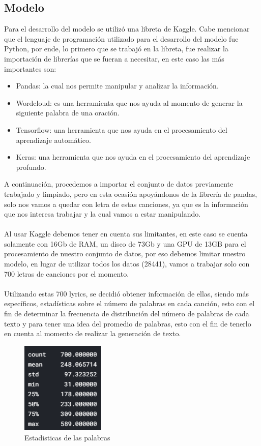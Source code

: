 \subsection{Modelo}
Para el desarrollo del modelo se utilizó una libreta de Kaggle. Cabe mencionar que el lenguaje de programación utilizado para el desarrollo del modelo fue Python, por ende, lo primero que se trabajó en la libreta, fue realizar la importación de librerías que se fueran a necesitar, en este caso las más importantes son:
\begin{itemize}
	\item Pandas: la cual nos permite manipular y analizar la información.
	\item Wordcloud: es una herramienta que nos ayuda al momento de generar la siguiente palabra de una oración.
	\item Tensorflow: una herramienta que nos ayuda en el procesamiento del aprendizaje automático.
	\item Keras: una herramienta que nos ayuda en el procesamiento del aprendizaje profundo.
\end{itemize}
A continuación, procedemos a importar el conjunto de datos previamente trabajado y limpiado, pero en esta ocasión apoyándonos de la librería de pandas, solo nos vamos a quedar con letra de estas canciones, ya que es la información que nos interesa trabajar y la cual vamos a estar manipulando.\\\\
Al usar Kaggle debemos tener en cuenta sus limitantes, en este caso se cuenta solamente con 16Gb de RAM, un disco de 73Gb y una GPU de 13GB para el procesamiento de nuestro conjunto de datos, por eso debemos limitar nuestro modelo, en lugar de utilizar todos los datos (28441), vamos a trabajar solo con 700 letras de canciones por el momento.\\\\ 
Utilizando estas 700 lyrics, se decidió obtener información de ellas, siendo más específicos, estadísticas sobre el número de palabras en cada canción, esto con el fin de determinar la frecuencia de distribución del número de palabras de cada texto y para tener una idea del promedio de palabras, esto con el fin de tenerlo en cuenta al momento de realizar la generación de texto.
\begin{figure}[h]
	\centering
	\includegraphics[width=4cm]{figuras/estadistica.png}
	\caption{Estadisticas de las palabras}
	\label{fig:Estadisticas_de_las_palabras}
\end{figure}

